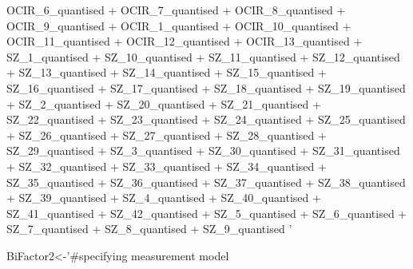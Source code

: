 \documentclass[]{article}
\newenvironment{Shaded}{\begin{snugshade}}{\end{snugshade}}
\newcommand{\StringTok}[1]{\textcolor[rgb]{0.31,0.60,0.02}{#1}}
\newcommand{\NormalTok}[1]{#1}
\begin{document}
\begin{Shaded}
\begin{Highlighting}[]
\StringTok{       OCIR_6_quantised +   }
\StringTok{       OCIR_7_quantised +   }
\StringTok{       OCIR_8_quantised +   }
\StringTok{       OCIR_9_quantised +   }
\StringTok{       OCIR_1_quantised +   }
\StringTok{       OCIR_10_quantised    +   }
\StringTok{       OCIR_11_quantised    +   }
\StringTok{       OCIR_12_quantised    +   }
\StringTok{       OCIR_13_quantised  +}
\StringTok{      SZ_1_quantised    +}
\StringTok{      SZ_10_quantised   +   }
\StringTok{      SZ_11_quantised + }
\StringTok{      SZ_12_quantised + }
\StringTok{      SZ_13_quantised + }
\StringTok{      SZ_14_quantised + }
\StringTok{      SZ_15_quantised + }
\StringTok{      SZ_16_quantised + }
\StringTok{      SZ_17_quantised + }
\StringTok{      SZ_18_quantised + }
\StringTok{      SZ_19_quantised + }
\StringTok{      SZ_2_quantised + }
\StringTok{      SZ_20_quantised + }
\StringTok{      SZ_21_quantised + }
\StringTok{      SZ_22_quantised + }
\StringTok{      SZ_23_quantised + }
\StringTok{      SZ_24_quantised + }
\StringTok{      SZ_25_quantised + }
\StringTok{      SZ_26_quantised + }
\StringTok{      SZ_27_quantised + }
\StringTok{      SZ_28_quantised + }
\StringTok{      SZ_29_quantised + }
\StringTok{      SZ_3_quantised + }
\StringTok{      SZ_30_quantised + }
\StringTok{      SZ_31_quantised + }
\StringTok{      SZ_32_quantised + }
\StringTok{      SZ_33_quantised + }
\StringTok{      SZ_34_quantised + }
\StringTok{      SZ_35_quantised + }
\StringTok{      SZ_36_quantised + }
\StringTok{      SZ_37_quantised + }
\StringTok{      SZ_38_quantised + }
\StringTok{      SZ_39_quantised + }
\StringTok{      SZ_4_quantised + }
\StringTok{      SZ_40_quantised + }
\StringTok{      SZ_41_quantised + }
\StringTok{      SZ_42_quantised + }
\StringTok{      SZ_5_quantised + }
\StringTok{      SZ_6_quantised + }
\StringTok{      SZ_7_quantised + }
\StringTok{      SZ_8_quantised + }
\StringTok{      SZ_9_quantised}
\StringTok{'}

\NormalTok{BiFactor2<-}\StringTok{'#specifying measurement model}


\end{Highlighting}
\end{Shaded}
\end{document}
